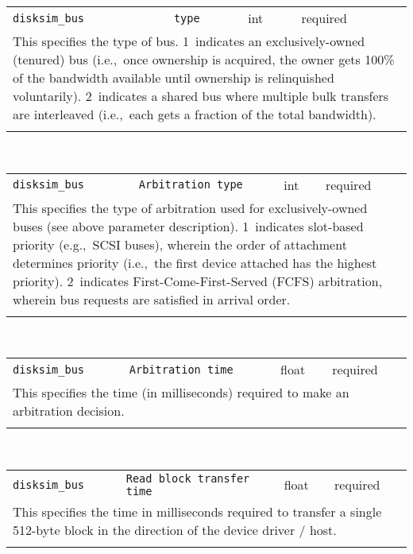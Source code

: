 \noindent 
\begin{tabular}{|p{1.5in}|p{3.5in}|p{0.5in}|p{0.5in}|}
\cline{1-4}
\texttt{disksim\_bus} & \texttt{type} & int & required \\ 
\cline{1-4}
\multicolumn{4}{|p{6in}|}{
This specifies the type of bus. 1~indicates an exclusively-owned
(tenured) bus (i.e.,~once ownership is acquired, the owner gets 100\%
of the bandwidth available until ownership is relinquished
voluntarily). 2~indicates a shared bus where multiple bulk transfers
are interleaved (i.e.,~each gets a fraction of the total bandwidth).
}\\ 
\cline{1-4}
\multicolumn{4}{p{5in}}{}\\
\end{tabular}\\ 
\noindent 
\begin{tabular}{|p{1.5in}|p{3.5in}|p{0.5in}|p{0.5in}|}
\cline{1-4}
\texttt{disksim\_bus} & \texttt{Arbitration type} & int & required \\ 
\cline{1-4}
\multicolumn{4}{|p{6in}|}{
This specifies the type of arbitration used for exclusively-owned buses
(see above parameter description). 1~indicates slot-based priority
(e.g.,~SCSI buses), wherein the order of attachment determines
priority (i.e.,~the first device attached has the highest priority).
2~indicates First-Come-First-Served (FCFS) arbitration, wherein bus
requests are satisfied in arrival order.
}\\ 
\cline{1-4}
\multicolumn{4}{p{5in}}{}\\
\end{tabular}\\ 
\noindent 
\begin{tabular}{|p{1.5in}|p{3.5in}|p{0.5in}|p{0.5in}|}
\cline{1-4}
\texttt{disksim\_bus} & \texttt{Arbitration time} & float & required \\ 
\cline{1-4}
\multicolumn{4}{|p{6in}|}{
This specifies the time (in milliseconds) required to make
an arbitration decision.
}\\ 
\cline{1-4}
\multicolumn{4}{p{5in}}{}\\
\end{tabular}\\ 
\noindent 
\begin{tabular}{|p{1.5in}|p{3.5in}|p{0.5in}|p{0.5in}|}
\cline{1-4}
\texttt{disksim\_bus} & \texttt{Read block transfer time} & float & required \\ 
\cline{1-4}
\multicolumn{4}{|p{6in}|}{
This specifies the time in milliseconds required to transfer a single
512-byte block in the direction of the device driver / host.
}\\ 
\cline{1-4}
\multicolumn{4}{p{5in}}{}\\
\end{tabular}\\ 
